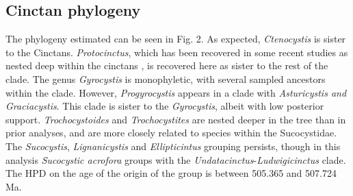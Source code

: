 \documentclass{article}
\begin{document}
\subsection{Cinctan phylogeny}

The phylogeny estimated can be seen in Fig. 2.
As expected, \textit{Ctenocystis} is sister to the Cinctans. 
\textit{Protocinctus}, which has been recovered in some recent studies as nested deep within the cinctans \citep{SmithZamora2009}, is recovered here as sister to the rest of the clade. 
The genus \textit{Gyrocystis} is monophyletic, with several sampled ancestors within the clade. 
However, \textit{Progyrocystis} appears in a clade with \textit{Asturicystis and Graciacystis}. 
This clade is sister to the \textit{Gyrocystis}, albeit with low posterior support. 
\textit{Trochocystoides} and \textit{Trochocystites} are nested deeper in the tree than in prior analyses, and are more closely related to species within the Sucocystidae.
The \textit{Sucocystis}, \textit{Lignanicystis} and \textit{Ellipticintus} grouping persists, though in this analysis \textit{Sucocystic acrofora} groups with the \textit{Undatacinctus}-\textit{Ludwigicinctus} clade.
The HPD on the age of the origin of the group is between 505.365 and 507.724 Ma.
\end{document}
